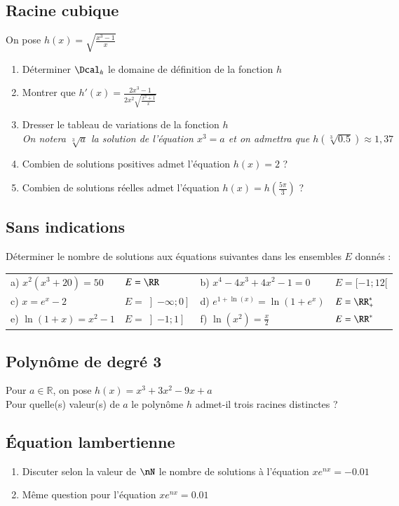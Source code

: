 \documentclass[oneside,12pt]{article}          %
\begin{document}
\subsection{Racine cubique}
On pose $h(x)=\sqrt{\frac{x^3-1}{x}}$
\begin{enumerate}
    \item Déterminer $\Dcal_h$ le domaine de définition de la fonction $h$
    \item Montrer que $h'(x)=\frac{2x^3-1}{2x^2\sqrt{\frac{x^3+1}{x}}}$
    \item Dresser le tableau de variations de la fonction $h$\\
    \textit{On notera $\sqrt[3]{a}$ la solution de l'équation $x^3=a$ et on admettra que $h\left(\sqrt[3]{0.5}\right)\approx1,37$}
    \item Combien de solutions positives admet l'équation $h(x)=2$ ?
    \item Combien de solutions réelles admet l'équation $h(x)=h\left(\frac{5\pi}{3}\right)$ ?
\end{enumerate}



\subsection{Sans indications}
Déterminer le nombre de solutions aux équations suivantes dans les ensembles $E$ donnés :

\renewcommand{\arraystretch}{1.3}
\begin{tabular}{p{} p{} | p{} p{}}
    a) $x^2(x^3+20)=50$ & $E=\RR$ & b) $x^4-4x^3+4x^2-1=0$ & $E=[-1;12[$ \\
    c) $x=e^x-2$ & $E=\left]-\infty;0\right]$ & d) $e^{1+\ln(x)}=\ln(1+e^x)$ & $E=\RR_+^*$ \\
    e) $\ln(1+x)=x^2-1$ & $E=\left]-1;1\right]$ & f) $\ln(x^2)=\frac{x}{2}$ & $E=\RR^*$
\end{tabular}



\subsection{Polynôme de degré 3}
Pour $a \in \mathbb{R}$, on pose $h(x) = x^3 + 3x^2 - 9x + a$\\
Pour quelle(s) valeur(s) de $a$ le polynôme $h$ admet-il trois racines distinctes ?



\subsection{Équation lambertienne}
\begin{enumerate}
    \item Discuter selon la valeur de $\nN$ le nombre de solutions à l'équation $xe^{nx}=-0.01$
    \item Même question pour l'équation $xe^{nx}=0.01$
\end{enumerate}
\end{document}
